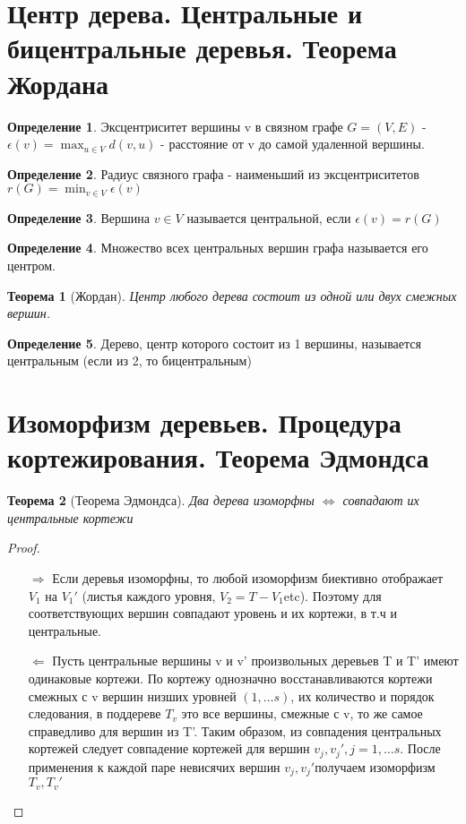 \documentclass[a4paper]{article}
\newtheorem{theorem}{Теорема}[section]
\theoremstyle{definition}
\newtheorem*{definition}{Определение}
\theoremstyle{remark}
\begin{document}
\begin{multicols*}{2}
    \section{Центр дерева. Центральные и бицентральные деревья. Теорема Жордана}
    \begin{definition}
        Эксцентриситет вершины v в связном графе $G = (V, E)$ - $\epsilon(v)=\max_{u\in V} d(v, u)$ - расстояние от v до самой удаленной вершины.
    \end{definition}
    \begin{definition}
        Радиус связного графа - наименьший из эксцентриситетов $r(G) = \min_{v\in V}\epsilon(v)$
    \end{definition}
    \begin{definition}
        Вершина $v\in V$ называется центральной, если $\epsilon(v) = r(G)$
    \end{definition}
    \begin{definition}
        Множество всех центральных вершин графа называется его центром.
    \end{definition}
    \begin{theorem}[Жордан]
        Центр любого дерева состоит из одной или двух смежных вершин.
    \end{theorem}
    \begin{definition}
        Дерево, центр которого состоит из 1 вершины, называется центральным (если из 2, то бицентральным)
    \end{definition}
    \section{Изоморфизм деревьев. Процедура кортежирования. Теорема Эдмондса}
    \begin{theorem}[Теорема Эдмондса]
        Два дерева изоморфны $\Leftrightarrow$ совпадают их центральные кортежи
    \end{theorem}
    \begin{proof}
        \begin{itemize}
            \item[$\Rightarrow$] Если деревья изоморфны, то любой изоморфизм биективно отображает $V_1$ на $V_1'$ (листья каждого уровня,
            $V_2 = T - V_1 $etc). Поэтому для соответствующих вершин совпадают уровень и их кортежи, в т.ч и центральные.
            \item[$\Leftarrow$] Пусть центральные вершины v и v' произвольных деревьев T и T'
            имеют одинаковые кортежи. По кортежу однозначно восстанавливаются кортежи смежных с v вершин
            низших уровней $(1, \dots s)$, их количество и порядок следования, в поддереве $T_v$ это
            все вершины, смежные с v, то же самое справедливо для вершин из T'. Таким образом,
            из совпадения центральных кортежей следует совпадение кортежей для вершин $v_j, v_j', j = 1, \dots s$.
            После применения к каждой паре невисячих вершин $v_j, v_j'$получаем изоморфизм $T_v, T_v'$


\end{itemize}
\end{proof}
\end{multicols*}
\end{document}
